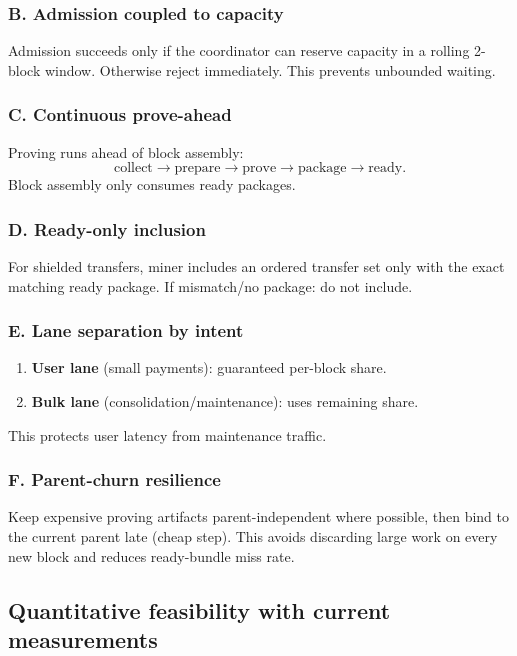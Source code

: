 \documentclass[11pt]{article}
\begin{document}
\subsubsection*{B. Admission coupled to capacity}
Admission succeeds only if the coordinator can reserve capacity in a rolling
2-block window. Otherwise reject immediately. This prevents unbounded waiting.

\subsubsection*{C. Continuous prove-ahead}
Proving runs ahead of block assembly:
\[
\text{collect} \rightarrow \text{prepare} \rightarrow \text{prove}
\rightarrow \text{package} \rightarrow \text{ready}.
\]
Block assembly only consumes ready packages.

\subsubsection*{D. Ready-only inclusion}
For shielded transfers, miner includes an ordered transfer set only with the
exact matching ready package. If mismatch/no package: do not include.

\subsubsection*{E. Lane separation by intent}
\begin{enumerate}[leftmargin=2em]
  \item \textbf{User lane} (small payments): guaranteed per-block share.
  \item \textbf{Bulk lane} (consolidation/maintenance): uses remaining share.
\end{enumerate}
This protects user latency from maintenance traffic.

\subsubsection*{F. Parent-churn resilience}
Keep expensive proving artifacts parent-independent where possible, then bind to
the current parent late (cheap step). This avoids discarding large work on every
new block and reduces ready-bundle miss rate.

\subsection{Quantitative feasibility with current measurements}
\end{document}
